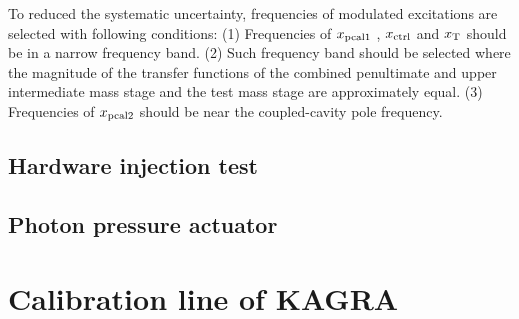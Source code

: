 To reduced the systematic uncertainty, frequencies of modulated excitations are selected with following conditions:
(1) Frequencies of $x_{\rm pcal1}$ , $x_{\rm ctrl}$ and $x_{\rm T}$ should be in a narrow frequency band.
(2) Such frequency band should be selected where the magnitude of the transfer functions of 
the combined penultimate and upper intermediate mass stage and the test mass stage are 
approximately equal.
(3) Frequencies of $x_{\rm pcal2}$ should be near the coupled-cavity pole frequency.


\subsection{Hardware injection test}


\subsection{Photon pressure actuator}


\section{Calibration line of KAGRA}



